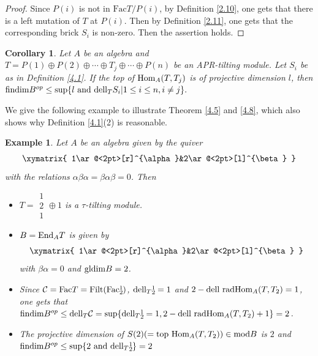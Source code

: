 \documentclass[a4paper]{amsart}
\newtheorem{cor}[thm]{Corollary}
\newtheorem{exm}[thm]{Example}
\theoremstyle{definition}
\theoremstyle{remark}
\numberwithin{equation}{section}
\begin{document}
\begin{proof} Since $P(i)$ is not in $\text{Fac} T/P(i)$, by Definition \ref{2.10}, one gets that there is a left mutation of $T$ at $P(i)$. Then by Definition \ref{2.11}, one gets that the corresponding brick $S_i$ is non-zero. Then the assertion holds.
\end{proof}

\begin{cor}\label{4.10} Let $A$ be an algebra and $T=P(1)\oplus P(2)\oplus\cdots\oplus T_j\oplus\cdots\oplus P(n)$ be an APR-tilting module. Let $ S_i$ be as in Definition \ref{4.1}. If the top of $\textup{Hom}_A(T, T_j)$ is of projective dimension $l$, then $\textup{findim}B^{op}\leq \textup{sup}\{l\ \textup{and}\ \textup{dell}_T S_i|1\leq i\leq n, i\neq j\}.$
\end{cor}

We give the following example to illustrate Theorem \ref{4.5} and \ref{4.8}, which also shows why Definition \ref{4.1}(2) is reasonable.

\begin{exm}\label{4.10} Let $A$ be an algebra given by the quiver \[\xymatrix{
1\ar@<2pt>[r]^{\alpha}&2\ar@<2pt>[l]^{\beta}
}\]  with the relations $\alpha\beta\alpha=\beta\alpha\beta=0$. Then
\begin{itemize}
    \item [(1)] $T=\substack{1\\2\\1}\oplus1$ is a $\tau$-tilting module.
    \item [(2)] $B=\textup{End}_A T$ is given by\[\xymatrix{
1\ar@<2pt>[r]^{\alpha}&2\ar@<2pt>[l]^{\beta}
}\] with $\beta\alpha=0$ and $\textup{gldim}B=2$.
    \item [(3)] Since $\mathcal{C}=\textup{Fac}T=\textup{Filt(Fac}\substack{1\\2})$, $\textup{dell}_T\substack{1\\2}=1$ and $2-\textup{dell}\ \textup{radHom}_A(T,T_2)=1$, one gets that
    $\textup{findim}B^{op}\leq\textup{dell}_T \mathcal{C}={\rm sup}\{\textup{dell}_T\substack{1\\2}=1, 2-\textup{dell}\ \textup{radHom}_A(T,T_2)+1\}=2$.
    \item [(4)] The projective dimension of $S(2)(={\rm top}\ \textup{Hom}_A(T, T_2))\in\textup{mod}B$ is $2$ and $\textup{findim}B^{op}\leq \textup{sup}\{2\ \textup{and}\ \textup{dell}_T\substack{1\\2}\}=2$
\end{itemize}
\end{exm}
\end{document}
